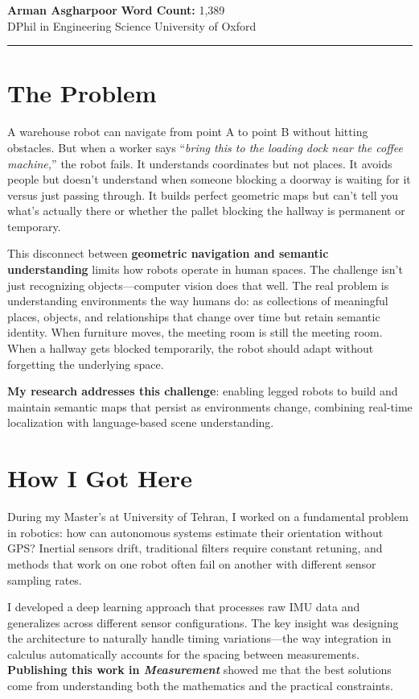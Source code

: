 \documentclass[12pt]{article}
\begin{document}
\vspace{-0.3cm}
{\Large\textbf{Arman Asgharpoor}} \hfill \textbf{Word Count:} 1,389\\
DPhil in Engineering Science \hfill University of Oxford
\rule[-0.2em]{\textwidth}{1pt}

\section*{The Problem}

A warehouse robot can navigate from point A to point B without hitting obstacles. But when a worker says ``\textit{bring this to the loading dock near the coffee machine,}'' the robot fails. It understands coordinates but not places. It avoids people but doesn't understand when someone blocking a doorway is waiting for it versus just passing through. It builds perfect geometric maps but can't tell you what's actually there or whether the pallet blocking the hallway is permanent or temporary.

This disconnect between \textbf{geometric navigation and semantic understanding} limits how robots operate in human spaces. The challenge isn't just recognizing objects—computer vision does that well. The real problem is understanding environments the way humans do: as collections of meaningful places, objects, and relationships that change over time but retain semantic identity. When furniture moves, the meeting room is still the meeting room. When a hallway gets blocked temporarily, the robot should adapt without forgetting the underlying space.

\textbf{My research addresses this challenge}: enabling legged robots to build and maintain semantic maps that persist as environments change, combining real-time localization with language-based scene understanding.

\section*{How I Got Here}

During my Master's at University of Tehran, I worked on a fundamental problem in robotics: how can autonomous systems estimate their orientation without GPS? Inertial sensors drift, traditional filters require constant retuning, and methods that work on one robot often fail on another with different sensor sampling rates.

I developed a deep learning approach that processes raw IMU data and generalizes across different sensor configurations. The key insight was designing the architecture to naturally handle timing variations—the way integration in calculus automatically accounts for the spacing between measurements. \textbf{Publishing this work in \textit{Measurement}} showed me that the best solutions come from understanding both the mathematics and the practical constraints.
\end{document}
